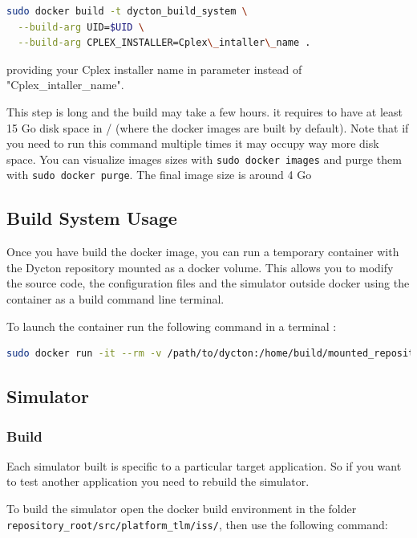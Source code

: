 \documentclass[10 pt]{article}
\begin{document}
\begin{lstlisting}[language=bash]
sudo docker build -t dycton_build_system \
  --build-arg UID=$UID \
  --build-arg CPLEX_INSTALLER=Cplex\_intaller\_name .

\end{lstlisting}
providing your Cplex installer name in parameter instead of "Cplex\_intaller\_name".

\bigskip
This step is long and the build may take a few hours. it requires to have at least 15 Go disk space in / (where the docker images are built by default).
Note that if you need to run this command multiple times it may occupy way more disk space. You can visualize images sizes with \lstinline{sudo docker images} and purge them with \lstinline{sudo docker purge}.
The final image size is around 4 Go


\subsection{Build System Usage}
Once you have build the docker image, you can run a temporary container with the Dycton repository mounted as a docker volume.
This allows you to modify the source code, the configuration files and the simulator outside docker using the container as a build command line terminal.

To launch the container run the following command in a terminal :

\begin{lstlisting}[language=bash]
sudo docker run -it --rm -v /path/to/dycton:/home/build/mounted_repository dycton_build_system
\end{lstlisting}

\subsection{Simulator}
\subsubsection{Build}
Each simulator built is specific to a particular target application. So if you want to test another application you need to rebuild the simulator.

To build the simulator open the docker build environment in the folder \lstinline{repository_root/src/platform_tlm/iss/}, then use the following command:
\end{document}
